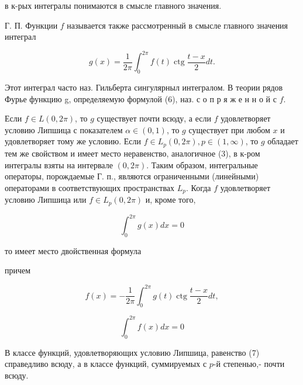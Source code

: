 \documentclass[10pt]{article}
\begin{document}
в к-рых интегралы понимаются в смысле главного значения.



Г. П. Функции $f$ называется также рассмотренный в смысле главного значения интеграл



\[

g(x)=\frac{1}{2 \pi} \int_{0}^{2 \pi} f(t) \operatorname{ctg} \frac{t-x}{2} d t .

\]



Этот интеграл часто наз. Гильберта сингулярныл интегралом. В теории рядов Фурье функцию g, определяемую формулой (6), наз. с о п р я ж е н н о й с $f$.



Если $f \in L(0,2 \pi)$, то $g$ существует почти всюду, а если $f$ удовлетворяет условию Липшица с показателем $\alpha \in(0,1)$, то $g$ существует при любом $x$ и удовлетворяет тому же условию. Если $f \in L_{p}(0,2 \pi), p \in(1, \infty)$, то $g$ обладает тем же свойством и имеет место неравенство, аналогичное (3), в к-ром интегралы взяты на интервале $(0,2 \pi)$. Таким образом, интегральные операторы, порождаемые Г. п., являются ограниченными (линейными) операторами в соответствующих пространствах $L_{p}$. Когда $f$ удовлетворяет условию Липшица или $f \in L_{p}(0,2 \pi)$ и, кроме того,



\[

\int_{0}^{2 \pi} g(x) d x=0

\]



то имеет место двойственная формула



причем



\[

f(x)=-\frac{1}{2 \pi} \int_{0}^{2 \pi} g(t) \operatorname{ctg} \frac{t-x}{2} d t,

\]



\[

\int_{0}^{2 \pi} f(x) d x=0

\]



В классе функций, удовлетворяющих условию Липшица, равенство (7) справедливо всюду, а в классе функций, суммируемых с $p$-й степенью,- почти всюду.
\end{document}
